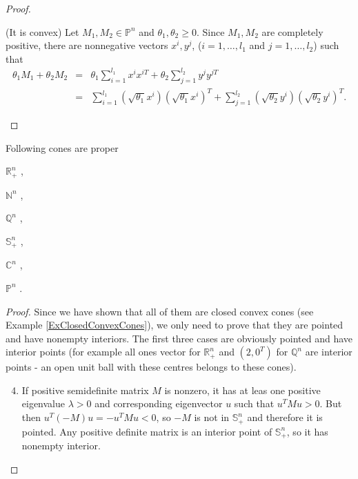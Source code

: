 \documentclass[12pt]{book}
\theoremstyle{definition}
\begin{document}
\begin{appendix}
\begin{proof}
\begin{enumerate}
(It is convex) Let $M_1, M_2\in \mathbb{P}^n$ and $\theta_1, \theta_2 \geq 0$. Since $M_1, M_2$ are completely positive, there are nonnegative vectors $x^i, y^j$, ($i = 1,\dots , l_1$ and $j = 1,\dots ,l_2$)  such that
\begin{eqnarray*}
 \theta_1 M_1 + \theta_2 M_2 &=& \theta_1\sum_{i = 1}^{l_1} x^{i}x^{iT} + \theta_2\sum_{j = 1}^{l_2} y^{j}y^{jT} \\
 		& = & \sum_{i = 1}^{l_1} (\sqrt{\theta_1} x^{i})(\sqrt{\theta_1} x^{i})^T + \sum_{j = 1}^{l_2} (\sqrt{\theta_2} y^{i})(\sqrt{\theta_2} y^{i})^T .
\end{eqnarray*}
\end{enumerate}
\end{proof}

%


 Following cones are proper
\label{ExProperCones}

\begin{enumerate*}
\item $\mathbb{R}^n_+$ , \ \
\item $\mathbb{N}^n$ , \ \
\item $\mathbb{Q}^n$ , \ \
\item $\mathbb{S}^n_+$ , \ \ 
\item $\mathbb{C}^n$ , \ \ 
\item $\mathbb{P}^n$ . \ \ 
\end{enumerate*}

\begin{proof} Since we have shown that all of them are closed convex cones (see Example \ref{ExClosedConvexCones}), we only need to prove that they are pointed and have nonempty interiors.
The first three cases are obviously pointed and have interior points (for example all ones vector for $\mathbb{R}^n_+$ and $(2,0^T)$ for $\mathbb{Q}^n$ are interior points - an open unit ball with these centres belongs to these cones). 
\begin{enumerate}
\setcounter{enumi}{3}
\item If positive semidefinite matrix $M$ is nonzero, it has at leas one positive eigenvalue $\lambda >0$ and corresponding eigenvector $u$ such that $u^TMu>0$. But then $u^T(-M)u = - u^TMu<0$, so $-M$ is not in $\mathbb{S}^n_+$ and therefore it is pointed. Any positive definite matrix is an interior point of $\mathbb{S}^n_+$, so it has nonempty interior. 


\end{enumerate}
\end{proof}
\end{appendix}
\end{document}
